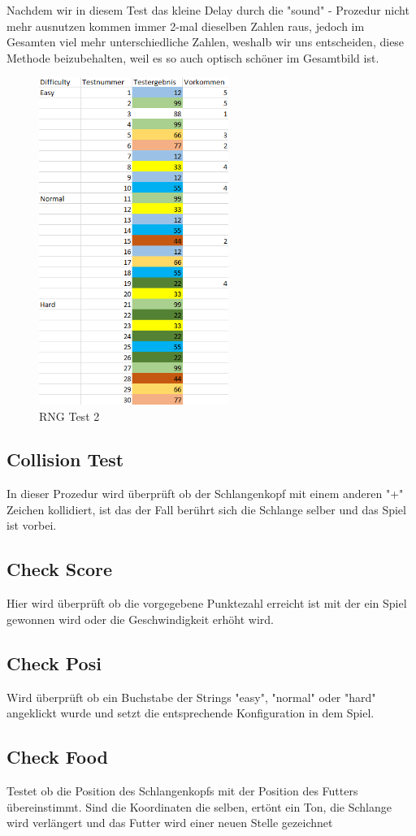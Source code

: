 \documentclass[a4paper,10pt]{article}
\begin{document}
			Nachdem wir in diesem Test das kleine Delay durch die "sound" \- - 
			Prozedur nicht mehr ausnutzen kommen immer 2-mal dieselben Zahlen 
			raus, 
			jedoch im Gesamten viel mehr unterschiedliche Zahlen, weshalb wir 
			uns entscheiden, diese Methode beizubehalten, weil es so auch 
			optisch schöner im Gesamtbild ist.
			\begin{figure}[h]
				\centering
				\includegraphics[width=0.55\textwidth]{tests_2}
				\caption{RNG Test 2}
				\label{RNG2}
			\end{figure}
			\newpage
		\subsection{Collision Test}
		
			In dieser Prozedur wird überprüft ob der Schlangenkopf mit einem 
			anderen "+" \- Zeichen kollidiert, ist das der Fall berührt sich 
			die 
			Schlange selber und das Spiel ist vorbei.
		\subsection{Check Score}
		
			Hier wird überprüft ob die vorgegebene Punktezahl erreicht ist mit 
			der ein Spiel gewonnen wird oder die Geschwindigkeit erhöht wird.
		\subsection{Check Posi}
		
			Wird überprüft ob ein Buchstabe der Strings "easy", "normal" \- 
			oder 
			"hard" \- angeklickt wurde und setzt die entsprechende 
			Konfiguration 
			in dem Spiel.
		\subsection{Check Food}
		
			Testet ob die Position des Schlangenkopfs mit der Position des 
			Futters übereinstimmt. Sind die Koordinaten die selben, ertönt ein 
			Ton, die Schlange wird verlängert und das Futter wird einer neuen 
			Stelle gezeichnet
\end{document}
